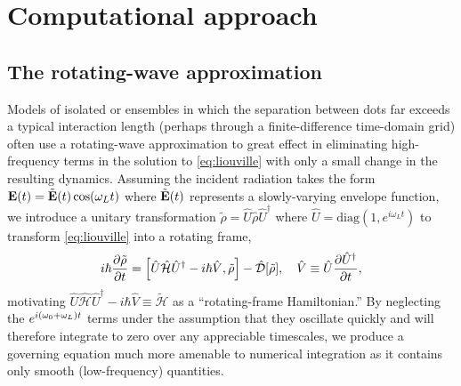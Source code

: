 \section{Computational approach}

\subsection{\label{sec:rwa}The rotating-wave approximation}

Models of isolated \qds{} or \qd{} ensembles in which the separation between dots far exceeds a typical interaction length (perhaps through a finite-difference time-domain grid) often use a rotating-wave approximation to great effect in eliminating high-frequency terms in the solution to \cref{eq:liouville} with only a small change in the resulting dynamics.
Assuming the incident radiation takes the form $\vb{E}(t) = \tilde{\vb{E}}(t) \cos(\omega_L t)$
where $\tilde{\vb{E}}(t)$ represents a slowly-varying envelope function, we introduce a unitary transformation $\tilde{\rho} = \hat{U} \hat{\rho} \hat{U}^\dagger$ where $\hat{U} = \mathrm{diag}(1, e^{i \omega_L t})$ to transform \cref{eq:liouville} into a rotating frame,
\begin{equation}
  i \hbar \pdv{\tilde{\rho}}{t} = \commutator{\hat{U} \hat{\mathcal{H}} \hat{U}^\dagger - i \hbar \hat{V}}{\tilde{\rho}} - \hat{\mathcal{D}}\qty[\tilde{\rho}], \quad \hat{V} \equiv \hat{U} \pdv{\hat{U}^\dagger}{t},
  \label{eq:rotating liouville}
\end{equation}
motivating $\hat{U} \hat{\mathcal{H}} \hat{U}^\dagger - i \hbar \hat{V} \equiv \tilde{\mathcal{H}}$ as a ``rotating-frame Hamiltonian.''
By neglecting the $e^{i \qty(\omega_0 + \omega_L) t}$ terms under the assumption that they oscillate quickly and will therefore integrate to zero over any appreciable timescales, we produce a governing equation much more amenable to numerical integration as it contains only smooth (low-frequency) quantities.

